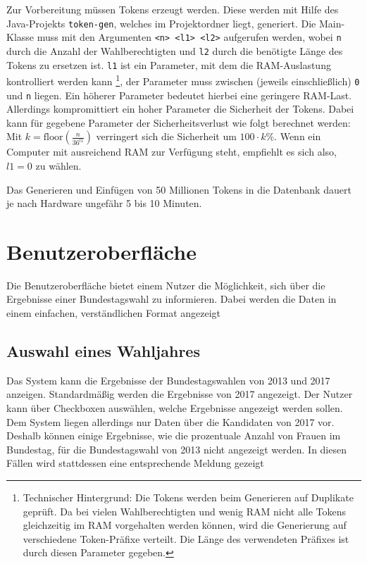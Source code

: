 \documentclass[a4paper]{scrreprt}
\begin{document}
Zur Vorbereitung müssen Tokens erzeugt werden.
Diese werden mit Hilfe des Java-Projekts \texttt{token-gen}, welches im Projektordner liegt, generiert.
Die Main-Klasse muss mit den Argumenten \texttt{<n> <l1> <l2>} aufgerufen werden, wobei \texttt{n} durch die Anzahl der Wahlberechtigten und \texttt{l2} durch die benötigte Länge des Tokens zu ersetzen ist.
\texttt{l1} ist ein Parameter, mit dem die RAM-Auslastung kontrolliert werden kann
\footnote{
	Technischer Hintergrund:
	Die Tokens werden beim Generieren auf Duplikate geprüft.
	Da bei vielen Wahlberechtigten und wenig RAM nicht alle Tokens gleichzeitig im RAM vorgehalten werden können, wird die Generierung auf verschiedene Token-Präfixe verteilt.
	Die Länge des verwendeten Präfixes ist durch diesen Parameter gegeben.
},
der Parameter muss zwischen (jeweils einschließlich) \texttt{0} und \texttt{n} liegen.
Ein höherer Parameter bedeutet hierbei eine geringere RAM-Last.
Allerdings kompromittiert ein hoher Parameter die Sicherheit der Tokens.
Dabei kann für gegebene Parameter der Sicherheitsverlust wie folgt berechnet werden:
Mit $k = \mathrm{floor}(\frac{n}{36^{l1}})$ verringert sich die Sicherheit um $100\cdot k$\%.
Wenn ein Computer mit ausreichend RAM zur Verfügung steht, empfiehlt es sich also, $l1 = 0$ zu wählen.

Das Generieren und Einfügen von 50 Millionen Tokens in die Datenbank dauert je nach Hardware ungefähr 5 bis 10 Minuten.

\section{Benutzeroberfläche}

Die Benutzeroberfläche bietet einem Nutzer die Möglichkeit, sich über die Ergebnisse einer Bundestagswahl zu informieren. Dabei werden die Daten in einem einfachen, verständlichen Format angezeigt

\subsection{Auswahl eines Wahljahres}

Das System kann die Ergebnisse der Bundestagswahlen von 2013 und 2017 anzeigen. Standardmäßig werden die Ergebnisse von 2017 angezeigt. Der Nutzer kann über Checkboxen auswählen, welche Ergebnisse angezeigt werden sollen. Dem System liegen allerdings nur Daten über die Kandidaten von 2017 vor. Deshalb können einige Ergebnisse, wie die prozentuale Anzahl von Frauen im Bundestag, für die Bundestagswahl von 2013 nicht angezeigt werden. In diesen Fällen wird stattdessen eine entsprechende Meldung gezeigt
\end{document}
